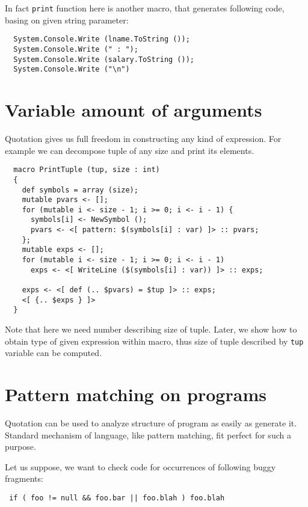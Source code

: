 \documentclass{llncs}
\begin{document}
In fact \verb,print, function here is another macro, that generates following
code, basing on given string parameter:

\begin{verbatim}
  System.Console.Write (lname.ToString ());
  System.Console.Write (" : ");
  System.Console.Write (salary.ToString ());
  System.Console.Write ("\n")
\end{verbatim}

\section{Variable amount of arguments}
Quotation gives us full freedom in constructing any kind of expression.
For example we can decompose tuple of any size and print its elements.

\begin{verbatim}
  macro PrintTuple (tup, size : int)
  {
    def symbols = array (size);
    mutable pvars <- [];
    for (mutable i <- size - 1; i >= 0; i <- i - 1) {
      symbols[i] <- NewSymbol ();
      pvars <- <[ pattern: $(symbols[i] : var) ]> :: pvars;
    };
    mutable exps <- [];
    for (mutable i <- size - 1; i >= 0; i <- i - 1)
      exps <- <[ WriteLine ($(symbols[i] : var)) ]> :: exps;

    exps <- <[ def (.. $pvars) = $tup ]> :: exps;
    <[ {.. $exps } ]>
  }
\end{verbatim} %

Note that here we need number describing size of tuple. Later, we show how
to obtain type of given expression within macro, thus size of tuple
described by \verb,tup, variable can be computed.

\section{Pattern matching on programs}
Quotation can be used to analyze structure of program as easily as generate
it. Standard mechanism of language, like pattern matching, fit perfect
for such a purpose. 

Let us suppose, we want to check code for occurrences of following buggy
fragments:
\begin{verbatim}
 if ( foo != null && foo.bar || foo.blah ) foo.blah
\end{verbatim}
\end{document}
